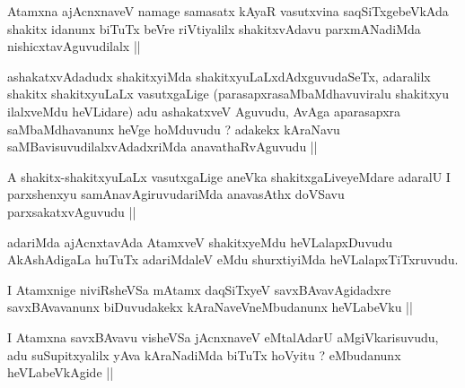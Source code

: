 
\begin{artha}
Atamxna ajAcnxnaveV namage samasatx kAyaR vasutxvina saqSiTxgebeVkAda
shakitx idanunx biTuTx beVre riVtiyalilx shakitxvAdavu parxmANadiMda
nishicxtavAguvudilalx ||
\end{artha}


\begin{artha}
ashakatxvAdadudx shakitxyiMda shakitxyuLaLxdAdxguvudaSeTx, adaralilx
shakitx shakitxyuLaLx vasutxgaLige (parasapxrasaMbaMdhavuviralu
shakitxyu ilalxveMdu heVLidare) adu ashakatxveV Aguvudu, AvAga
aparasapxra saMbaMdhavanunx heVge hoMduvudu ? adakekx kAraNavu
saMBavisuvudilalxvAdadxriMda anavathaRvAguvudu ||
\end{artha}


\begin{artha}
A shakitx-shakitxyuLaLx vasutxgaLige aneVka shakitxgaLiveyeMdare
adaralU I parxshenxyu samAnavAgiruvudariMda anavasAthx doVSavu
parxsakatxvAguvudu ||
\end{artha}


\begin{artha}
adariMda ajAcnxtavAda AtamxveV shakitxyeMdu heVLalapxDuvudu
AkAshAdigaLa huTuTx adariMdaleV eMdu shurxtiyiMda heVLalapxTiTxruvudu.
\end{artha}



\begin{artha}
I Atamxnige niviRsheVSa mAtamx daqSiTxyeV savxBAvavAgidadxre
savxBAvavanunx biDuvudakekx kAraNaveVneMbudanunx heVLabeVku ||
\end{artha}

\begin{artha}
I Atamxna savxBAvavu visheVSa jAcnxnaveV eMtalAdarU aMgiVkarisuvudu,
adu suSupitxyalilx yAva kAraNadiMda biTuTx hoVyitu ? eMbudanunx
heVLabeVkAgide ||
\end{artha}


